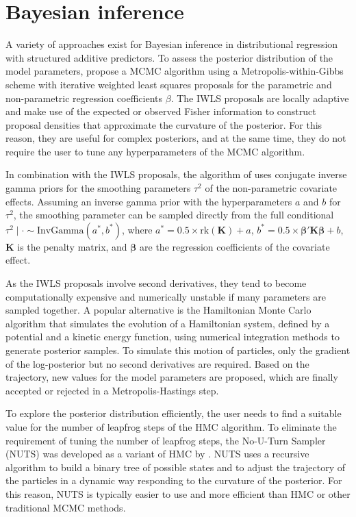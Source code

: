 \documentclass{article}
\newcommand{\Kmat}{\mathbf{K}}
\newcommand{\betavec}{\bm{\beta}}
\begin{document}
\section{Bayesian inference}
\label{sec:inference}

A variety of approaches exist for Bayesian inference in distributional regression with structured additive predictors. To assess the posterior distribution of the model parameters, \citet{kleinCount2015} propose a MCMC algorithm using a Metropolis-within-Gibbs scheme with iterative weighted least squares \citep[IWLS, ][]{gamermanSampling1997} proposals for the parametric and non-parametric regression coefficients $\beta$. The IWLS proposals are locally adaptive and make use of the expected or observed Fisher information to construct proposal densities that approximate the curvature of the posterior. For this reason, they are useful for complex posteriors, and at the same time, they do not require the user to tune any hyperparameters of the MCMC algorithm.

In combination with the IWLS proposals, the algorithm of \citet{kleinCount2015} uses conjugate inverse gamma priors for the smoothing parameters $\tau^2$ of the non-parametric covariate effects. Assuming an inverse gamma prior with the hyperparameters $a$ and $b$ for $\tau^2$, the smoothing parameter can be sampled directly from the full conditional $\tau^2 \mid \cdot \sim \text{InvGamma}(a^*, b^*)$, where $a^* = 0.5 \times \text{rk}(\Kmat) + a$, $b^* = 0.5 \times \betavec'\Kmat\betavec + b$, $\Kmat$ is the penalty matrix, and $\betavec$ are the regression coefficients of the covariate effect.

As the IWLS proposals involve second derivatives, they tend to become computationally expensive and numerically unstable if many parameters are sampled together. A popular alternative is the Hamiltonian Monte Carlo \citep[HMC, ][]{nealMCMC2011} algorithm that simulates the evolution of a Hamiltonian system, defined by a potential and a kinetic energy function, using numerical integration methods to generate posterior samples. To simulate this motion of particles, only the gradient of the log-posterior but no second derivatives are required. Based on the trajectory, new values for the model parameters are proposed, which are finally accepted or rejected in a Metropolis-Hastings step.

To explore the posterior distribution efficiently, the user needs to find a suitable value for the number of leapfrog steps of the HMC algorithm. To eliminate the requirement of tuning the number of leapfrog steps, the No-U-Turn Sampler (NUTS) was developed as a variant of HMC by \citet{hoffmanNoUTurn2014}. NUTS uses a recursive algorithm to build a binary tree of possible states and to adjust the trajectory of the particles in a dynamic way responding to the curvature of the posterior. For this reason, NUTS is typically easier to use and more efficient than HMC or other traditional MCMC methods.
\end{document}
